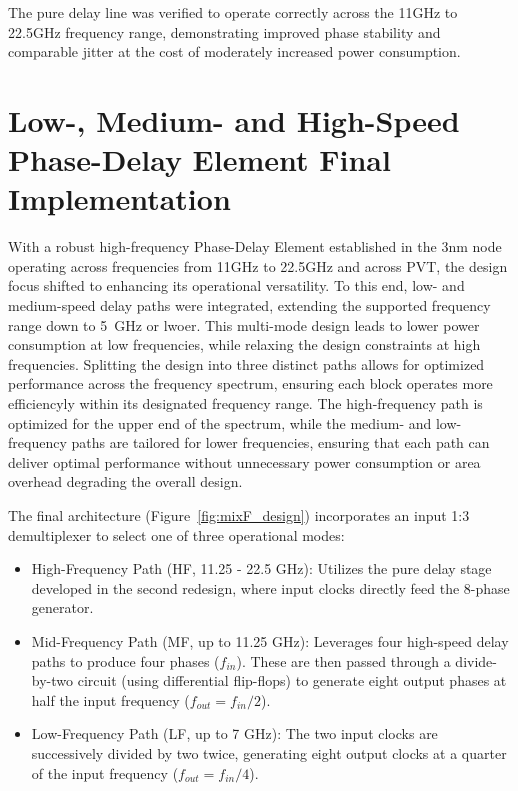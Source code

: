 The pure delay line was verified to operate correctly across the 11GHz to 22.5GHz frequency range, demonstrating improved phase stability and comparable jitter at the cost of moderately increased power consumption.

\section{Low-, Medium- and High-Speed Phase-Delay Element Final Implementation}\label{sec:mixF_design}

With a robust high-frequency Phase-Delay Element established in the 3nm node operating across frequencies from 11GHz to 22.5GHz and across PVT, the design focus shifted to enhancing its operational versatility. To this end, low- and medium-speed delay paths were integrated, extending the supported frequency range down to 5~GHz or lwoer. This multi-mode design leads to lower power consumption at low frequencies, while relaxing the design constraints at high frequencies.
Splitting the design into three distinct paths allows for optimized performance across the frequency spectrum, ensuring each block operates more efficiencyly within its designated frequency range. The high-frequency path is optimized for the upper end of the spectrum, while the medium- and low-frequency paths are tailored for lower frequencies, ensuring that each path can deliver optimal performance without unnecessary power consumption or area overhead degrading the overall design.

The final architecture (Figure~\ref{fig:mixF_design}) incorporates an input 1:3 demultiplexer to select one of three operational modes:

\begin{itemize}
    \item High-Frequency Path (HF, 11.25 - 22.5 GHz): Utilizes the pure delay stage developed in the second redesign, where input clocks directly feed the 8-phase generator.
    \item Mid-Frequency Path (MF, up to 11.25 GHz): Leverages four high-speed delay paths to produce four phases ($f_{in}$). These are then passed through a divide-by-two circuit (using differential flip-flops) to generate eight output phases at half the input frequency ($f_{out} = f_{in}/2$).
    \item Low-Frequency Path (LF, up to 7 GHz): The two input clocks are successively divided by two twice, generating eight output clocks at a quarter of the input frequency ($f_{out} = f_{in}/4$).
\end{itemize}


